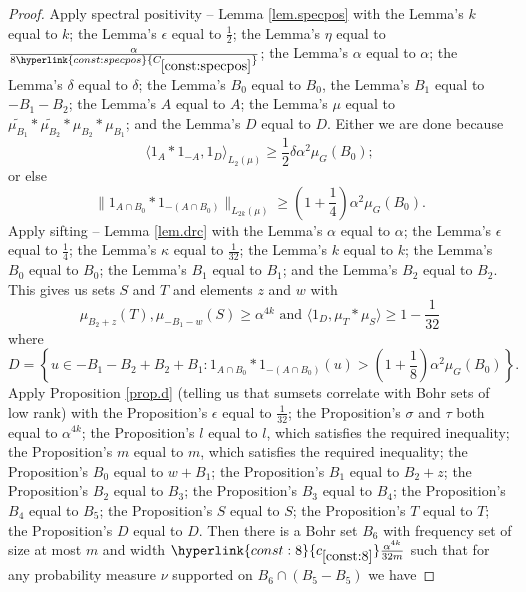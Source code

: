 \documentclass[12pt,reqno]{amsart}
\providecommand{\wt}{\widetilde}
\numberwithin{equation}{section}
\newcommand{\refconstlittle}[1]{%
    \hyperlink{const:#1}{c_{\ref{const:#1}}}%
}
\newcommand{\refconstbig}[1]{%
    \hyperlink{const:#1}{C_{\ref{const:#1}}}%
}
\begin{document}
\begin{proof}
Apply spectral positivity -- Lemma \ref{lem.specpos} with the Lemma's $k$ equal to $k$; the Lemma's $\epsilon$ equal to $\frac{1}{2}$; the Lemma's $\eta$ equal to $\frac{\alpha}{8\refconstbig{specpos}}$; the Lemma's $\alpha$ equal to $\alpha$; the Lemma's $\delta$ equal to $\delta$; the Lemma's ${B_0}$ equal to ${B_0}$, the Lemma's $B_1$ equal to $-B_1-B_2$; the Lemma's $A$ equal to $A$; the Lemma's $\mu$ equal to $\wt{\mu_{B_1}} \ast \wt{\mu_{B_2}} \ast \mu_{B_2} \ast \mu_{B_1}$; and the Lemma's $D$ equal to $D$. Either we are done because
\begin{equation*}
\langle 1_A \ast 1_{-A}, 1_{D}\rangle_{L_2(\mu)} \geq \frac{1}{2}\delta\alpha^2\mu_G({B_0});
\end{equation*}
or else 
\begin{equation*}
\|1_{A \cap {B_0}} \ast 1_{-(A\cap {B_0})}\|_{L_{2k}(\mu)} \geq \left(1+\frac{1}{4}\right)\alpha^2\mu_G({B_0}).
\end{equation*}
Apply sifting -- Lemma \ref{lem.drc} with the Lemma's $\alpha$ equal to $\alpha$; the Lemma's $\epsilon$ equal to $\frac{1}{4}$; the Lemma's $\kappa$ equal to $\frac{1}{32}$; the Lemma's $k$ equal to $k$; the Lemma's ${B_0}$ equal to ${B_0}$; the Lemma's $B_1$ equal to $B_1$; and the Lemma's $B_2$ equal to $B_2$. This gives us sets $S$ and $T$ and elements $z$ and $w$ with
\begin{equation*}
\mu_{B_2+z}(T) ,\mu_{-B_1-w}(S) \geq \alpha^{4k} \text{ and }\langle 1_D,\mu_{T} \ast \mu_{S}\rangle \geq 1-\frac{1}{32}
\end{equation*}
where
\begin{equation*}
D=\left\{u \in -B_1-B_2+B_2+B_1: 1_{A\cap {B_0}} \ast 1_{-(A\cap {B_0})}(u)>\left(1+\frac{1}{8}\right)\alpha^2\mu_G({B_0})\right\}.
\end{equation*}
Apply Proposition \ref{prop.d} (telling us that sumsets correlate with Bohr sets of low rank) with the Proposition's $\epsilon$ equal to $\frac{1}{32}$; the Proposition's $\sigma$ and $\tau$ both equal to $\alpha^{4k}$; the Proposition's $l$ equal to $l$, which satisfies the required inequality; the Proposition's $m$ equal to $m$, which satisfies the required inequality; the Proposition's ${B_0}$ equal to $w+B_1$; the Proposition's $B_1$ equal to $B_2+z$; the Proposition's $B_2$ equal to $B_3$; the Proposition's $B_3$ equal to $B_4$; the Proposition's $B_4$ equal to $B_5$; the Proposition's $S$ equal to $S$; the Proposition's $T$ equal to $T$; the Proposition's $D$ equal to $D$. Then there is a Bohr set $B_6$ with frequency set of size at most $m$ and width $\refconstlittle{8}\frac{\alpha^{4k}}{32m}$ such that for any probability measure $\nu$ supported on $B_6\cap (B_5-B_5)$ we have

\end{proof}
\end{document}
